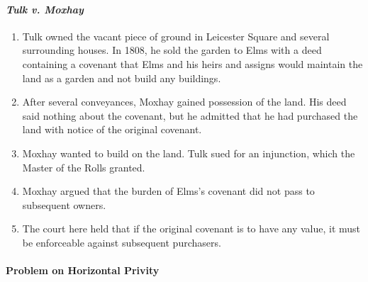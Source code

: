\paragraph{\emph{Tulk v. Moxhay}}

\begin{enumerate}
    \item Tulk owned the vacant piece of ground in Leicester Square and 
    several surrounding houses. In 1808, he sold the garden to Elms with a 
    deed containing a covenant that Elms and his heirs and assigns would 
    maintain the land as a garden and not build any buildings.
    \item After several conveyances, Moxhay gained possession of the land. His 
    deed said nothing about the covenant, but he admitted that he had 
    purchased the land with notice of the original covenant.
    \item Moxhay wanted to build on the land. Tulk sued for an injunction, 
    which the Master of the Rolls granted.
    \item Moxhay argued that the burden of Elms's covenant did not pass to 
    subsequent owners.
    \item The court here held that if the original covenant is to have any 
    value, it must be enforceable against subsequent purchasers.
\end{enumerate}

\paragraph{Problem on Horizontal Privity}

